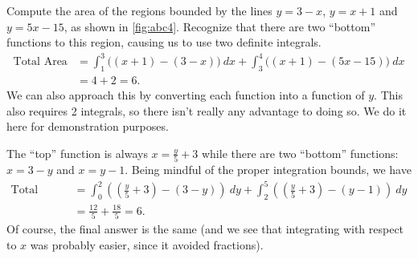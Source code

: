 \begin{example}\label{ex_abc4}
Compute the area of the regions bounded by the lines
$y=3-x$, $y=x+1$ and $y=5x-15$, as shown in \autoref{fig:abc4}.
\solution
Recognize that there are two ``bottom'' functions to this region, causing us to use two definite integrals.
\begin{align*}
	\text{Total Area}
	&= \int_1^3\bigl((x+1)-(3-x)\bigr)\ dx + \int_3^4\bigl((x+1)-(5x-15)\bigr)\ dx \\
	&= 4+2
	= 6.
\end{align*}
We can also approach this by converting each function into a function of $y$. This also requires 2 integrals, so there isn't really any advantage to doing so. We do it here for demonstration purposes.

The ``top'' function is always $x=\frac y5+3$ while there are two ``bottom'' functions: $x=3-y$ and $x=y-1$. Being mindful of the proper integration bounds, we have
\begin{align*}
	\text{Total Area}
	&= \int_0^2\left(\left(\frac y5+3\right) - (3-y)\right)\ dy
	+ \int_2^5\left(\left(\frac y5+3\right) - (y-1)\right)\ dy \\
	&= \frac{12}5 + \frac{18}5
	= 6.
\end{align*}
Of course, the final answer is the same (and we see that integrating with respect to $x$ was probably easier, since it avoided fractions).
\end{example}

